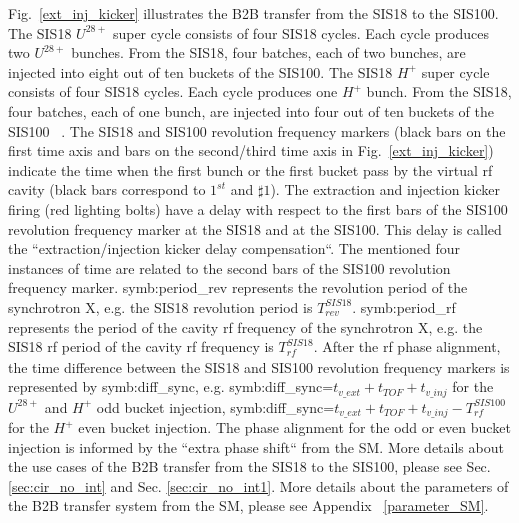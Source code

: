Fig.~\ref{ext_inj_kicker} illustrates the B2B transfer from the SIS18 to the SIS100. The SIS18 $U^{28+}$ super cycle consists of four SIS18 cycles. Each cycle produces two $U^{28+}$ bunches. From the SIS18, four batches, each of two bunches, are injected into eight out of ten buckets of the SIS100. The SIS18 $H^{+}$ super cycle consists of four SIS18 cycles. Each cycle produces one $H^{+}$ bunch. From the SIS18, four batches, each of one bunch, are injected into four out of ten buckets of the SIS100 ~\cite{liebermann_fair_2013, liebermann_sis100_2013}. The SIS18 and SIS100 revolution frequency markers (black bars on the first time axis and bars on the second/third time axis in Fig.~\ref{ext_inj_kicker}) indicate the time when the first bunch or the first bucket pass by the virtual rf cavity (black bars correspond to $1^{st}$ and $\sharp1$). The extraction and injection kicker firing (red lighting bolts) have a delay with respect to the first bars of the SIS100 revolution frequency marker at the SIS18 and at the SIS100. This delay is called the ``extraction/injection kicker delay compensation``. The mentioned four instances of time are related to the second bars of the SIS100 revolution frequency marker. \gls{symb:period_rev} represents the revolution period of the synchrotron X, e.g. the SIS18 revolution period is $T_{\mathit{rev}}^{\mathit{SIS18}}$. \gls{symb:period_rf} represents the period of the cavity rf frequency of the synchrotron X, e.g. the SIS18 rf period of the cavity rf frequency is $T_{\mathit{rf}}^{\mathit{SIS18}}$. After the rf phase alignment, the time difference between the SIS18 and SIS100 revolution frequency markers is represented by \gls{symb:diff_sync}, e.g. \gls{symb:diff_sync}=$t_{\mathit{v\_ext}}+t_{\mathit{TOF}}+t_{\mathit{v\_inj}}$ for the $U^{28+}$ and $H^{+}$ odd bucket injection,  \gls{symb:diff_sync}=$t_{\mathit{v\_ext}}+t_{\mathit{TOF}}+t_{\mathit{v\_inj}}- T_{\mathit{rf}}^{\mathit{SIS100}}$ for the $H^{+}$ even bucket injection. The phase alignment for the odd or even bucket injection is informed by the ``extra phase shift`` from the SM. More details about the use cases of the B2B transfer from the SIS18 to the SIS100, please see Sec. \ref{sec:cir_no_int} and Sec. \ref{sec:cir_no_int1}. More details about the parameters of the B2B transfer system from the SM, please see Appendix ~\ref{parameter_SM}.  

